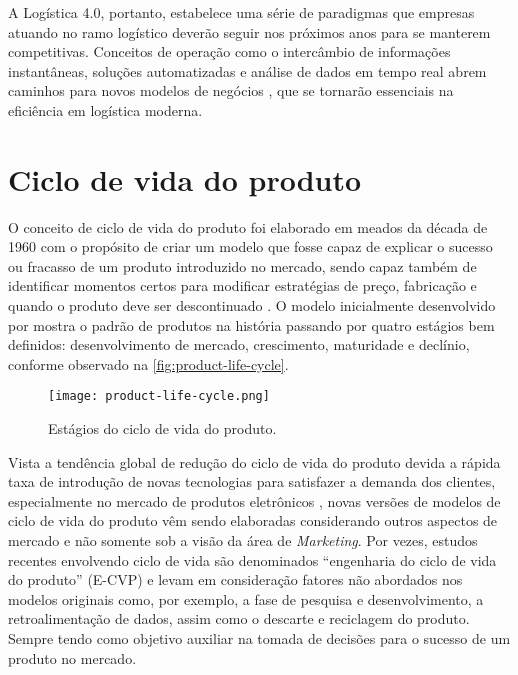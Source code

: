 	A Logística 4.0, portanto, estabelece uma série de paradigmas que empresas atuando no ramo logístico deverão seguir nos próximos anos para se manterem competitivas. Conceitos de operação como o intercâmbio de informações instantâneas, soluções automatizadas e análise de dados em tempo real abrem caminhos para novos modelos de negócios \cite{strandhagen2017logistics}, que se tornarão essenciais na eficiência em logística moderna.

	
\section{Ciclo de vida do produto}
	
	O conceito de ciclo de vida do produto foi elaborado em meados da década de 1960 com o propósito de criar um modelo que fosse capaz de explicar o sucesso ou fracasso de um produto introduzido no mercado, sendo capaz também de identificar momentos certos para modificar estratégias de preço, fabricação e quando o produto deve ser descontinuado \cite{cao2012lifecycle}. O modelo inicialmente desenvolvido por  mostra o padrão de produtos na história passando por quatro estágios bem definidos: desenvolvimento de mercado, crescimento, maturidade e declínio, conforme observado na \autoref{fig:product-life-cycle}.
	
	\begin{figure}[htb]
		\centering
		\caption{Estágios do ciclo de vida do produto.}
		\label{fig:product-life-cycle}
		\texttt{[image: product-life-cycle.png]}
	\end{figure}
	
	Vista a tendência global de redução do ciclo de vida do produto devida a rápida taxa de introdução de novas tecnologias para satisfazer a demanda dos clientes, especialmente no mercado de produtos eletrônicos \cite{trappey2008lifecycle}, novas versões de modelos de ciclo de vida do produto vêm sendo elaboradas considerando outros aspectos de mercado e não somente sob a visão da área de \textit{Marketing}. Por vezes, estudos recentes envolvendo ciclo de vida são denominados ``engenharia do ciclo de vida do produto'' (E-CVP) \cite{cao2012lifecycle} e levam em consideração fatores não abordados nos modelos originais como, por exemplo, a fase de pesquisa e desenvolvimento, a retroalimentação de dados, assim como o descarte e reciclagem do produto. Sempre tendo como objetivo auxiliar na tomada de decisões para o sucesso de um produto no mercado.
	
